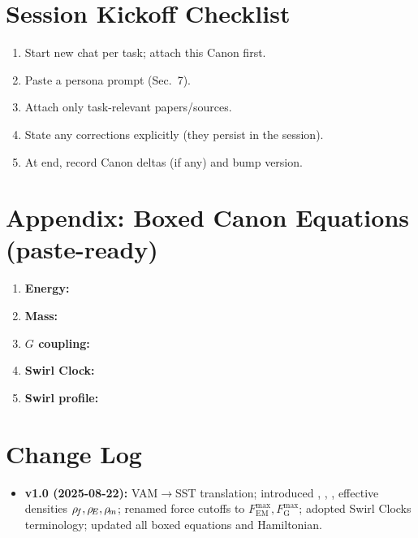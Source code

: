 \documentclass[11pt]{article}
\begin{document}
    \section{Session Kickoff Checklist}
    \begin{enumerate}
        \item Start new chat per task; attach this Canon first.
        \item Paste a persona prompt (Sec.~7).
        \item Attach only task-relevant papers/sources.
        \item State any corrections explicitly (they persist in the session).
        \item At end, record Canon deltas (if any) and bump version.
    \end{enumerate}



    \section*{Appendix: Boxed Canon Equations (paste-ready)}
    \begin{enumerate}
        \item \textbf{Energy:} 
        \item \textbf{Mass:} 
        \item \textbf{$G$ coupling:} 
        \item \textbf{Swirl Clock:} 
        \item \textbf{Swirl profile:} 
    \end{enumerate}



    \section*{Change Log}
    \begin{itemize}
        \item \textbf{v1.0 (2025-08-22):} VAM$\rightarrow$SST translation; introduced \vswirl, \omegas, \rs, effective densities \(\rho_{\!f},\rho_{\!E},\rho_{\!m}\); renamed force cutoffs to \(F_{\text{EM}}^{\max}, F_{\text{G}}^{\max}\); adopted Swirl Clocks terminology; updated all boxed equations and Hamiltonian.
    \end{itemize}

    \nocite{*}
    
    
\end{document}

